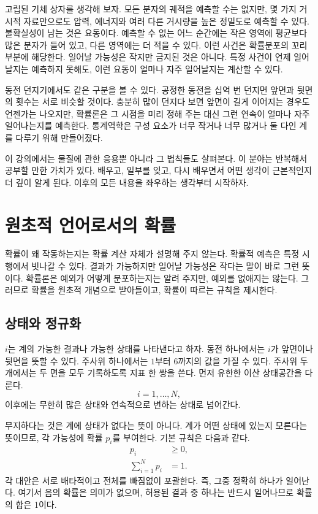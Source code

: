 고립된 기체 상자를 생각해 보자. 모든 분자의 궤적을 예측할 수는 없지만, 몇 가지 거시적 자료만으로도 압력, 에너지와 여러 다른 거시량을 높은 정밀도로 예측할 수 있다. 불확실성이 남는 것은 요동이다. 예측할 수 없는 어느 순간에는 작은 영역에 평균보다 많은 분자가 들어 있고, 다른 영역에는 더 적을 수 있다. 이런 사건은 확률분포의 꼬리 부분에 해당한다. 일어날 가능성은 작지만 금지된 것은 아니다. 특정 사건이 언제 일어날지는 예측하지 못해도, 이런 요동이 얼마나 자주 일어날지는 계산할 수 있다.

동전 던지기에서도 같은 구분을 볼 수 있다. 공정한 동전을 십억 번 던지면 앞면과 뒷면의 횟수는 서로 비슷할 것이다. 충분히 많이 던지다 보면 앞면이 길게 이어지는 경우도 언젠가는 나오지만, 확률론은 그 시점을 미리 정해 주는 대신 그런 연속이 얼마나 자주 일어나는지를 예측한다. 통계역학은 구성 요소가 너무 작거나 너무 많거나 둘 다인 계를 다루기 위해 만들어졌다.

이 강의에서는 물질에 관한 응용뿐 아니라 그 법칙들도 살펴본다. 이 분야는 반복해서 공부할 만한 가치가 있다. 배우고, 일부를 잊고, 다시 배우면서 어떤 생각이 근본적인지 더 깊이 알게 된다. 이후의 모든 내용을 좌우하는 생각부터 시작하자.

\section{원초적 언어로서의 확률}

확률이 왜 작동하는지는 확률 계산 자체가 설명해 주지 않는다. 확률적 예측은 특정 시행에서 빗나갈 수 있다. 결과가 가능하지만 일어날 가능성은 작다는 말이 바로 그런 뜻이다. 확률론은 예외가 어떻게 분포하는지는 알려 주지만, 예외를 없애지는 않는다. 그러므로 확률을 원초적 개념으로 받아들이고, 확률이 따르는 규칙을 제시한다.

\subsection{상태와 정규화}

\(i\)는 계의 가능한 결과나 가능한 상태를 나타낸다고 하자. 동전 하나에서는 \(i\)가 앞면이나 뒷면을 뜻할 수 있다. 주사위 하나에서는 \(1\)부터 \(6\)까지의 값을 가질 수 있다. 주사위 두 개에서는 두 면을 모두 기록하도록 지표 한 쌍을 쓴다. 먼저 유한한 이산 상태공간을 다룬다.
\begin{equation}
 i=1,\ldots,N,
\end{equation}
이후에는 무한히 많은 상태와 연속적으로 변하는 상태로 넘어간다.

무지하다는 것은 계에 상태가 없다는 뜻이 아니다. 계가 어떤 상태에 있는지 모른다는 뜻이므로, 각 가능성에 확률 \(p_i\)를 부여한다. 기본 규칙은 다음과 같다.
\begin{align}
 p_i &\geq 0, \label{eq:sm1-prob-positive}\\
 \sum_{i=1}^{N}p_i &=1. \label{eq:sm1-prob-normalization}
\end{align}
각 대안은 서로 배타적이고 전체를 빠짐없이 포괄한다. 즉, 그중 정확히 하나가 일어난다. 여기서 음의 확률은 의미가 없으며, 허용된 결과 중 하나는 반드시 일어나므로 확률의 합은 1이다.


